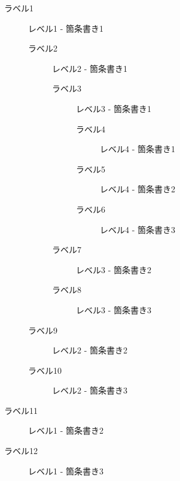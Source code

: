 \begin{description}
  \item[ラベル1] レベル1 - 箇条書き1
    \begin{description}
      \item[ラベル2] レベル2 - 箇条書き1
        \begin{description}
          \item[ラベル3] レベル3 - 箇条書き1
            \begin{description}
              \item[ラベル4] レベル4 - 箇条書き1
              \item[ラベル5] レベル4 - 箇条書き2
              \item[ラベル6] レベル4 - 箇条書き3
            \end{description}
          \item[ラベル7] レベル3 - 箇条書き2
          \item[ラベル8] レベル3 - 箇条書き3
        \end{description}
      \item[ラベル9] レベル2 - 箇条書き2
      \item[ラベル10] レベル2 - 箇条書き3
    \end{description}
  \item[ラベル11] レベル1 - 箇条書き2
  \item[ラベル12] レベル1 - 箇条書き3
\end{description}
